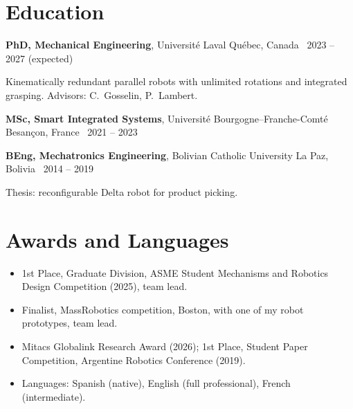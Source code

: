 \documentclass[10pt,letterpaper]{article}
\begin{document}
\section{Education}
\textbf{PhD, Mechanical Engineering}, Universit\'e Laval \hfill {\color{muted}Qu\'ebec, Canada \textbar\ 2023 -- 2027 (expected)}\par
{\small Kinematically redundant parallel robots with unlimited rotations and integrated grasping. Advisors: C.~Gosselin, P.~Lambert.}\par\vspace{2pt}
\textbf{MSc, Smart Integrated Systems}, Universit\'e Bourgogne--Franche-Comt\'e \hfill {\color{muted}Besan\c{c}on, France \textbar\ 2021 -- 2023}\par\vspace{2pt}
\textbf{BEng, Mechatronics Engineering}, Bolivian Catholic University \hfill {\color{muted}La Paz, Bolivia \textbar\ 2014 -- 2019}\par
{\small Thesis: reconfigurable Delta robot for product picking.}

\section{Awards and Languages}
\begin{itemize}
\item 1st Place, Graduate Division, ASME Student Mechanisms and Robotics Design Competition (2025), team lead.
\item Finalist, MassRobotics competition, Boston, with one of my robot prototypes, team lead.
\item Mitacs Globalink Research Award (2026); 1st Place, Student Paper Competition, Argentine Robotics Conference (2019).
\item Languages: Spanish (native), English (full professional), French (intermediate).
\end{itemize}

\newpage
\end{document}
